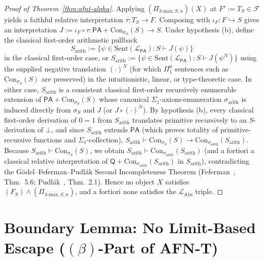 \documentclass[11pt]{article}
\theoremstyle{plain}
\theoremstyle{definition}
\newcommand{\cF}{\mathcal{F}}
\newcommand{\LAbs}{\mathcal{L}_{\mathrm{Abs}}}
\newcommand{\Con}{\mathrm{Con}}
\newcommand{\PA}{\mathsf{PA}}
\begin{document}
\begin{proof}[Proof of Theorem~\ref{thm:afnt-alpha}]
Applying $(\Pi_{3\text{-max}, S, n})(X)$ at $F' := T_S \in \cF$ yields a faithful relative interpretation $\tau : T_S \to F$. Composing with $\iota_F : F \hookrightarrow S$ gives an interpretation $J := \iota_F \circ \tau : \PA + \Con_{\sigma_S}(S) \to S$. Under hypothesis (b), define the classical first-order arithmetic pullback
\[
  S_{\mathrm{arith}} := \{\psi \in \mathrm{Sent}(\mathcal{L}_{\PA}) : S \vdash J(\psi)\}
\]
in the classical first-order case, or $S_{\mathrm{arith}} := \{\psi \in \mathrm{Sent}(\mathcal{L}_{\PA}) : S \vdash J(\psi^N)\}$ using the supplied negative translation $(\cdot)^N$ (for which $\Pi_1^0$ sentences such as $\Con_{\sigma_S}(S)$ are preserved) in the intuitionistic, linear, or type-theoretic case. In either case, $S_{\mathrm{arith}}$ is a consistent classical first-order recursively enumerable extension of $\PA + \Con_{\sigma_S}(S)$ whose canonical $\Sigma_1$-axiom-enumeration $\sigma_{\mathrm{arith}}$ is induced directly from $\sigma_S$ and $J$ (or $J \circ (\cdot)^N$). By hypothesis (b), every classical first-order derivation of $0 = 1$ from $S_{\mathrm{arith}}$ translates primitive recursively to an $S$-derivation of $\bot$, and since $S_{\mathrm{arith}}$ extends $\PA$ (which proves totality of primitive-recursive functions and $\Sigma_1$-collection), $S_{\mathrm{arith}} \vdash \Con_{\sigma_S}(S) \to \Con_{\sigma_{\mathrm{arith}}}(S_{\mathrm{arith}})$. Because $S_{\mathrm{arith}} \vdash \Con_{\sigma_S}(S)$, we obtain $S_{\mathrm{arith}} \vdash \Con_{\sigma_{\mathrm{arith}}}(S_{\mathrm{arith}})$ (and a fortiori a classical relative interpretation of $\mathsf{Q} + \Con_{\sigma_{\mathrm{arith}}}(S_{\mathrm{arith}})$ in $S_{\mathrm{arith}}$), contradicting the G\"odel--Feferman--Pudl\'ak Second Incompleteness Theorem (Feferman~\cite{Feferman1960}, Thm.~5.6; Pudl\'ak~\cite{Pudlak1985}, Thm.~2.1). Hence no object $X$ satisfies $(F_S) \wedge (\Pi_{3\text{-max}, S, n})$, and a fortiori none satisfies the $\LAbs$ triple.
\end{proof}

\section{\texorpdfstring{Boundary Lemma: No Limit-Based Escape ($(\beta)$-Part of AFN-T)}{Boundary Lemma: No Limit-Based Escape ((beta)-Part of AFN-T)}}\label{sec:afnt-beta}
\end{document}
